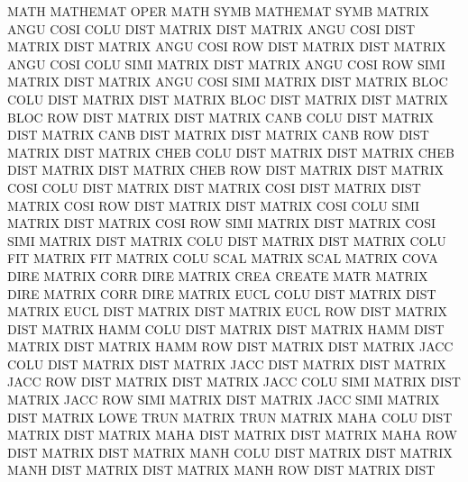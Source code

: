 MATH                                    MATHEMAT OPER
MATH     SYMB                           MATHEMAT SYMB
MATRIX   ANGU COSI COLU DIST            MATRIX   DIST
MATRIX   ANGU COSI DIST                 MATRIX   DIST
MATRIX   ANGU COSI ROW  DIST            MATRIX   DIST
MATRIX   ANGU COSI COLU SIMI            MATRIX   DIST
MATRIX   ANGU COSI ROW  SIMI            MATRIX   DIST
MATRIX   ANGU COSI SIMI                 MATRIX   DIST
MATRIX   BLOC COLU DIST                 MATRIX   DIST
MATRIX   BLOC DIST                      MATRIX   DIST
MATRIX   BLOC ROW  DIST                 MATRIX   DIST
MATRIX   CANB COLU DIST                 MATRIX   DIST
MATRIX   CANB DIST                      MATRIX   DIST
MATRIX   CANB ROW  DIST                 MATRIX   DIST
MATRIX   CHEB COLU DIST                 MATRIX   DIST
MATRIX   CHEB DIST                      MATRIX   DIST
MATRIX   CHEB ROW  DIST                 MATRIX   DIST
MATRIX   COSI COLU DIST                 MATRIX   DIST
MATRIX   COSI DIST                      MATRIX   DIST
MATRIX   COSI ROW  DIST                 MATRIX   DIST
MATRIX   COSI COLU SIMI                 MATRIX   DIST
MATRIX   COSI ROW  SIMI                 MATRIX   DIST
MATRIX   COSI SIMI                      MATRIX   DIST
MATRIX   COLU DIST                      MATRIX   DIST
MATRIX   COLU FIT                       MATRIX   FIT
MATRIX   COLU SCAL                      MATRIX   SCAL
MATRIX   COVA DIRE                      MATRIX   CORR DIRE
MATRIX   CREA                           CREATE   MATR
MATRIX   DIRE                           MATRIX   CORR DIRE
MATRIX   EUCL COLU DIST                 MATRIX   DIST
MATRIX   EUCL DIST                      MATRIX   DIST
MATRIX   EUCL ROW  DIST                 MATRIX   DIST
MATRIX   HAMM COLU DIST                 MATRIX   DIST
MATRIX   HAMM DIST                      MATRIX   DIST
MATRIX   HAMM ROW  DIST                 MATRIX   DIST
MATRIX   JACC COLU DIST                 MATRIX   DIST
MATRIX   JACC DIST                      MATRIX   DIST
MATRIX   JACC ROW  DIST                 MATRIX   DIST
MATRIX   JACC COLU SIMI                 MATRIX   DIST
MATRIX   JACC ROW  SIMI                 MATRIX   DIST
MATRIX   JACC SIMI                      MATRIX   DIST
MATRIX   LOWE TRUN                      MATRIX   TRUN
MATRIX   MAHA COLU DIST                 MATRIX   DIST
MATRIX   MAHA DIST                      MATRIX   DIST
MATRIX   MAHA ROW  DIST                 MATRIX   DIST
MATRIX   MANH COLU DIST                 MATRIX   DIST
MATRIX   MANH DIST                      MATRIX   DIST
MATRIX   MANH ROW  DIST                 MATRIX   DIST
